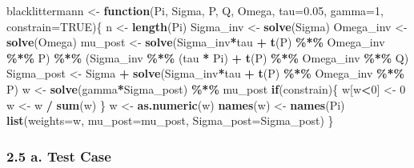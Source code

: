 \documentclass[
  12pt,
]{article}
\newenvironment{Shaded}{\begin{snugshade}}{\end{snugshade}}
\newcommand{\AttributeTok}[1]{\textcolor[rgb]{0.13,0.29,0.53}{#1}}
\newcommand{\ConstantTok}[1]{\textcolor[rgb]{0.56,0.35,0.01}{#1}}
\newcommand{\ControlFlowTok}[1]{\textcolor[rgb]{0.13,0.29,0.53}{\textbf{#1}}}
\newcommand{\DecValTok}[1]{\textcolor[rgb]{0.00,0.00,0.81}{#1}}
\newcommand{\FloatTok}[1]{\textcolor[rgb]{0.00,0.00,0.81}{#1}}
\newcommand{\FunctionTok}[1]{\textcolor[rgb]{0.13,0.29,0.53}{\textbf{#1}}}
\newcommand{\NormalTok}[1]{#1}
\newcommand{\OtherTok}[1]{\textcolor[rgb]{0.56,0.35,0.01}{#1}}
\newcommand{\SpecialCharTok}[1]{\textcolor[rgb]{0.81,0.36,0.00}{\textbf{#1}}}
\begin{document}
\begin{Shaded}
\begin{Highlighting}[]
\NormalTok{blacklittermann }\OtherTok{\textless{}{-}} \ControlFlowTok{function}\NormalTok{(Pi, Sigma, P, Q, Omega, }\AttributeTok{tau=}\FloatTok{0.05}\NormalTok{, }\AttributeTok{gamma=}\DecValTok{1}\NormalTok{, }\AttributeTok{constrain=}\ConstantTok{TRUE}\NormalTok{)\{}
\NormalTok{  n }\OtherTok{\textless{}{-}} \FunctionTok{length}\NormalTok{(Pi)}
\NormalTok{  Sigma\_inv }\OtherTok{\textless{}{-}} \FunctionTok{solve}\NormalTok{(Sigma)}
\NormalTok{  Omega\_inv }\OtherTok{\textless{}{-}} \FunctionTok{solve}\NormalTok{(Omega)}
\NormalTok{  mu\_post }\OtherTok{\textless{}{-}} \FunctionTok{solve}\NormalTok{(Sigma\_inv}\SpecialCharTok{*}\NormalTok{tau }\SpecialCharTok{+} \FunctionTok{t}\NormalTok{(P) }\SpecialCharTok{\%*\%}\NormalTok{ Omega\_inv }\SpecialCharTok{\%*\%}\NormalTok{ P) }\SpecialCharTok{\%*\%}
\NormalTok{             (Sigma\_inv }\SpecialCharTok{\%*\%}\NormalTok{ (tau }\SpecialCharTok{*}\NormalTok{ Pi) }\SpecialCharTok{+} \FunctionTok{t}\NormalTok{(P) }\SpecialCharTok{\%*\%}\NormalTok{ Omega\_inv }\SpecialCharTok{\%*\%}\NormalTok{ Q)}
\NormalTok{  Sigma\_post }\OtherTok{\textless{}{-}}\NormalTok{ Sigma }\SpecialCharTok{+} \FunctionTok{solve}\NormalTok{(Sigma\_inv}\SpecialCharTok{*}\NormalTok{tau }\SpecialCharTok{+} \FunctionTok{t}\NormalTok{(P) }\SpecialCharTok{\%*\%}\NormalTok{ Omega\_inv }\SpecialCharTok{\%*\%}\NormalTok{ P)}
\NormalTok{  w }\OtherTok{\textless{}{-}} \FunctionTok{solve}\NormalTok{(gamma}\SpecialCharTok{*}\NormalTok{Sigma\_post) }\SpecialCharTok{\%*\%}\NormalTok{ mu\_post}
  \ControlFlowTok{if}\NormalTok{(constrain)\{}
\NormalTok{    w[w}\SpecialCharTok{\textless{}}\DecValTok{0}\NormalTok{] }\OtherTok{\textless{}{-}} \DecValTok{0}
\NormalTok{    w }\OtherTok{\textless{}{-}}\NormalTok{ w }\SpecialCharTok{/} \FunctionTok{sum}\NormalTok{(w)}
\NormalTok{  \}}
\NormalTok{  w }\OtherTok{\textless{}{-}} \FunctionTok{as.numeric}\NormalTok{(w)}
  \FunctionTok{names}\NormalTok{(w) }\OtherTok{\textless{}{-}} \FunctionTok{names}\NormalTok{(Pi)}
  \FunctionTok{list}\NormalTok{(}\AttributeTok{weights=}\NormalTok{w, }\AttributeTok{mu\_post=}\NormalTok{mu\_post, }\AttributeTok{Sigma\_post=}\NormalTok{Sigma\_post)}
\NormalTok{\}}
\end{Highlighting}
\end{Shaded}

\subsubsection{2.5 a. Test Case}\label{a.-test-case}
\end{document}
